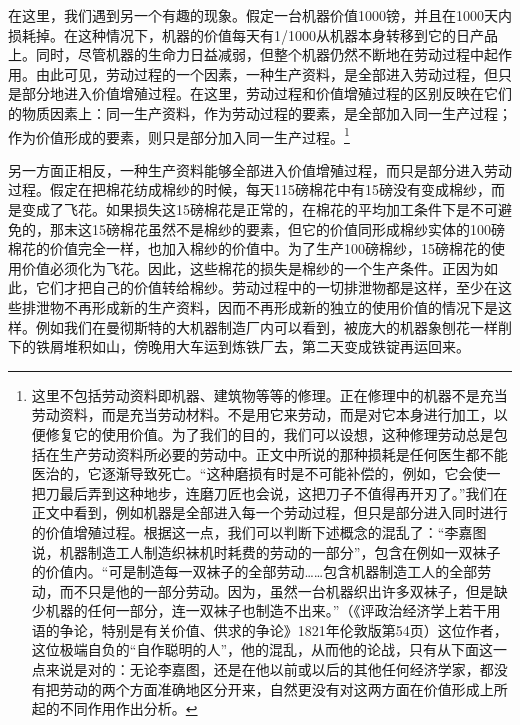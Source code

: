 \documentclass{ctexbook}
\begin{document}
在这里，我们遇到另一个有趣的现象。假定一台机器价值1000镑，并且在1000天内损耗掉。在这种情况下，机器的价值每天有1/1000从机器本身转移到它的日产品上。同时，尽管机器的生命力日益减弱，但整个机器仍然不断地在劳动过程中起作用。由此可见，劳动过程的一个因素，一种生产资料，是全部进入劳动过程，但只是部分地进入价值增殖过程。在这里，劳动过程和价值增殖过程的区别反映在它们的物质因素上：同一生产资料，作为劳动过程的要素，是全部加入同一生产过程；作为价值形成的要素，则只是部分加入同一生产过程。\footnote{这里不包括劳动资料即机器、建筑物等等的修理。正在修理中的机器不是充当劳动资料，而是充当劳动材料。不是用它来劳动，而是对它本身进行加工，以便修复它的使用价值。为了我们的目的，我们可以设想，这种修理劳动总是包括在生产劳动资料所必要的劳动中。正文中所说的那种损耗是任何医生都不能医治的，它逐渐导致死亡。“这种磨损有时是不可能补偿的，例如，它会使一把刀最后弄到这种地步，连磨刀匠也会说，这把刀子不值得再开刃了。”我们在正文中看到，例如机器是全部进入每一个劳动过程，但只是部分进入同时进行的价值增殖过程。根据这一点，我们可以判断下述概念的混乱了：“李嘉图说，机器制造工人制造织袜机时耗费的劳动的一部分”，包含在例如一双袜子的价值内。“可是制造每一双袜子的全部劳动……包含机器制造工人的全部劳动，而不只是他的一部分劳动。因为，虽然一台机器织出许多双袜子，但是缺少机器的任何一部分，连一双袜子也制造不出来。”（《评政治经济学上若干用语的争论，特别是有关价值、供求的争论》1821年伦敦版第54页）这位作者，这位极端自负的“自作聪明的人”，他的混乱，从而他的论战，只有从下面这一点来说是对的：无论李嘉图，还是在他以前或以后的其他任何经济学家，都没有把劳动的两个方面准确地区分开来，自然更没有对这两方面在价值形成上所起的不同作用作出分析。}

另一方面正相反，一种生产资料能够全部进入价值增殖过程，而只是部分进入劳动过程。假定在把棉花纺成棉纱的时候，每天115磅棉花中有15磅没有变成棉纱，而是变成了飞花。如果损失这15磅棉花是正常的，在棉花的平均加工条件下是不可避免的，那末这15磅棉花虽然不是棉纱的要素，但它的价值同形成棉纱实体的100磅棉花的价值完全一样，也加入棉纱的价值中。为了生产100磅棉纱，15磅棉花的使用价值必须化为飞花。因此，这些棉花的损失是棉纱的一个生产条件。正因为如此，它们才把自己的价值转给棉纱。劳动过程中的一切排泄物都是这样，至少在这些排泄物不再形成新的生产资料，因而不再形成新的独立的使用价值的情况下是这样。例如我们在曼彻斯特的大机器制造厂内可以看到，被庞大的机器象刨花一样削下的铁屑堆积如山，傍晚用大车运到炼铁厂去，第二天变成铁锭再运回来。
\end{document}
